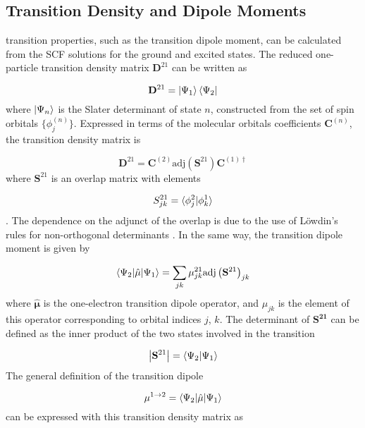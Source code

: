 \subsection{Transition Density and Dipole Moments}
\label{subsec:dscf_transition_density}
\dscf transition properties, such as the transition dipole moment, can be calculated from
the SCF solutions for the ground and excited states. The reduced one-particle transition
density matrix $\mathbf{D}^{21}$ can be written as

\begin{equation}
\mathbf{D}^{21} = \ket{\Psi_1} \bra{\Psi_2}
\end{equation}
%
where $\ket{\Psi_n}$ is the Slater determinant of state $n$, constructed from the
set of spin orbitals $\{ \phi_{j}^{\left(n\right)} \} $. Expressed in terms of
the molecular orbitals coefficients $\mathbf{C}^{\left(n\right)}$, the transition 
density matrix is

\begin{equation}
\mathbf{D}^{21} = \mathbf{C}^{\left(2\right)} \text{adj}\left(\mathbf{S}^{21}\right) \mathbf{C}^{\left(1\right) \dagger}
\end{equation}
%
where $\mathbf{S}^{21}$ is an overlap matrix with elements 

\begin{equation}
S^{21}_{jk} = \braket{\phi^2_j|\phi^1_k}
\end{equation}
%
. The dependence on the adjunct of the overlap is due to the use of L{\"o}wdin's
rules for non-orthogonal determinants \cite{Lowdin1955}. In the same way, the transition
dipole moment is given by

\begin{equation}
\braket{\Psi_2|\hat{\mathbf{\mu}}|\Psi_1} = \sum_{jk} \mathbf{\mu}_{jk}^{21} \text{adj} \left( \mathbf{S}^{21}\right)_{jk}
\end{equation}
%
where $\hat{\mathbf{\mu}}$ is the one-electron transition dipole operator, and
$\mu_{jk}$ is the element of this operator corresponding to orbital indices $j$, $k$.
The determinant of $\mathbf{S^{21}}$ can be defined as the inner product of the 
two states involved in the transition

\begin{equation}
\left\lvert {\mathbf{S}^{21}} \right\rvert = \braket{\Psi_2|\Psi_1}
\end{equation}
%
The general definition of the transition dipole

\begin{equation}
\mathbf{\mu}^{1\rightarrow2} = \braket{\Psi_2|\hat{\mathbf{\mu}}|\Psi_1}
\end{equation}
%
can be expressed with this transition density matrix as


